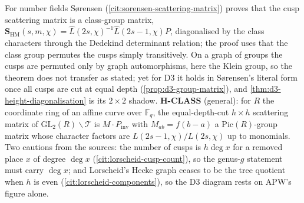 \begin{observation}
\label{obs:h-class}
For number fields Sørensen (\cref{cit:sorensen-scattering-matrix}) proves that the cusp scattering
matrix is a class-group matrix, $\mathbf S_{\mathrm{HM}}(s,m,\chi) = \hat L(2s,\chi)^{-1}\hat L(2s-1,\chi)P$, diagonalised by
the class characters through the Dedekind determinant relation; the proof uses that the class group
permutes the cusps simply transitively. On a graph of groups the cusps are permuted only by graph
automorphisms, here the Klein group, so the theorem does not transfer as stated; yet for $\mathrm{D3}$ it holds in
Sørensen's literal form once all cusps are cut at equal depth (\cref{prop:d3-group-matrix}), and
\cref{thm:d3-height-diagonalisation} is its $2\times2$ shadow. \textbf{H-CLASS} (general): for $R$ the coordinate ring of an affine curve over $\mathbb F_q$, the equal-depth-cut
$h\times h$ scattering matrix of $\mathrm{GL}_2(R)\backslash\mathcal T$ is $M\cdot P_{\mathrm{inv}}$ with $M_{ab} = f(b-a)$ a
$\mathrm{Pic}(R)$-group matrix whose character factors are $L(2s-1,\chi)/L(2s,\chi)$ up to monomials. Two cautions from the sources: the number
of cusps is $h\deg x$ for a removed place $x$ of degree $\deg x$ (\cref{cit:lorscheid-cusp-count}), so the
genus-$g$ statement must carry $\deg x$; and Lorscheid's Hecke graph ceases to be the tree quotient when
$h$ is even (\cref{cit:lorscheid-components}), so the $\mathrm{D3}$ diagram rests on APW's figure alone.
\end{observation}
